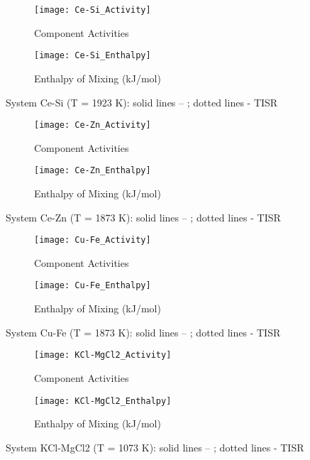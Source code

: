 \documentclass[12pt,abstract]{scrartcl}
\begin{document}
\begin{figure}
\centering
\begin{subfigure}{.5\textwidth}
  \centering
  \texttt{[image: Ce-Si\_Activity]}
  \caption{Component Activities}
  \label{fig:sub1}
\end{subfigure}%
\begin{subfigure}{.5\textwidth}
  \centering
  \texttt{[image: Ce-Si\_Enthalpy]}
  \caption{Enthalpy of Mixing (kJ/mol)}
  \label{fig:sub2}
\end{subfigure}
\caption{System Ce-Si (T = 1923 K): solid lines -- \cite{Ce-Si_Data}; dotted lines - TISR}
\label{fig:Ce-Si}
\end{figure}


\begin{figure}
\centering
\begin{subfigure}{.5\textwidth}
  \centering
  \texttt{[image: Ce-Zn\_Activity]}
  \caption{Component Activities}
  \label{fig:sub1}
\end{subfigure}%
\begin{subfigure}{.5\textwidth}
  \centering
  \texttt{[image: Ce-Zn\_Enthalpy]}
  \caption{Enthalpy of Mixing (kJ/mol)}
  \label{fig:sub2}
\end{subfigure}
\caption{System Ce-Zn (T = 1873 K): solid lines -- \cite{Ce-Zn_Data}; dotted lines - TISR}
\label{fig:Ce-Zn}
\end{figure}

\begin{figure}
\centering
\begin{subfigure}{.5\textwidth}
  \centering
  \texttt{[image: Cu-Fe\_Activity]}
  \caption{Component Activities}
  \label{fig:sub1}
\end{subfigure}%
\begin{subfigure}{.5\textwidth}
  \centering
  \texttt{[image: Cu-Fe\_Enthalpy]}
  \caption{Enthalpy of Mixing (kJ/mol)}
  \label{fig:sub2}
\end{subfigure}
\caption{System Cu-Fe (T = 1873 K): solid lines -- \cite{Cu-Fe_Data}; dotted lines - TISR}
\label{fig:Cu-Fe}
\end{figure}

\begin{figure}
\centering
\begin{subfigure}{.5\textwidth}
  \centering
  \texttt{[image: KCl-MgCl2\_Activity]}
  \caption{Component Activities}
  \label{fig:sub1}
\end{subfigure}%
\begin{subfigure}{.5\textwidth}
  \centering
  \texttt{[image: KCl-MgCl2\_Enthalpy]}
  \caption{Enthalpy of Mixing (kJ/mol)}
  \label{fig:sub2}
\end{subfigure}
\caption{System KCl-MgCl2 (T = 1073 K): solid lines -- \cite{Pelton_p1}; dotted lines - TISR}
\label{fig:KCl-MgCl2}
\end{figure}
\end{document}
